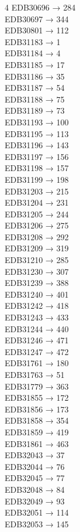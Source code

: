 \begin{multicols}{4}
EDB30696 → 284\\
EDB30697 → 344\\
EDB30801 → 112\\
EDB31183 → 1\\
EDB31184 → 4\\
EDB31185 → 17\\
EDB31186 → 35\\
EDB31187 → 54\\
EDB31188 → 75\\
EDB31189 → 73\\
EDB31193 → 100\\
EDB31195 → 113\\
EDB31196 → 143\\
EDB31197 → 156\\
EDB31198 → 157\\
EDB31199 → 198\\
EDB31203 → 215\\
EDB31204 → 231\\
EDB31205 → 244\\
EDB31206 → 275\\
EDB31208 → 292\\
EDB31209 → 319\\
EDB31210 → 285\\
EDB31230 → 307\\
EDB31239 → 388\\
EDB31240 → 401\\
EDB31242 → 418\\
EDB31243 → 433\\
EDB31244 → 440\\
EDB31246 → 471\\
EDB31247 → 472\\
EDB31761 → 180\\
EDB31763 → 51\\
EDB31779 → 363\\
EDB31855 → 172\\
EDB31856 → 173\\
EDB31858 → 354\\
EDB31859 → 419\\
EDB31861 → 463\\
EDB32043 → 37\\
EDB32044 → 76\\
EDB32045 → 77\\
EDB32048 → 84\\
EDB32049 → 93\\
EDB32051 → 114\\
EDB32053 → 145\\

\end{multicols}
